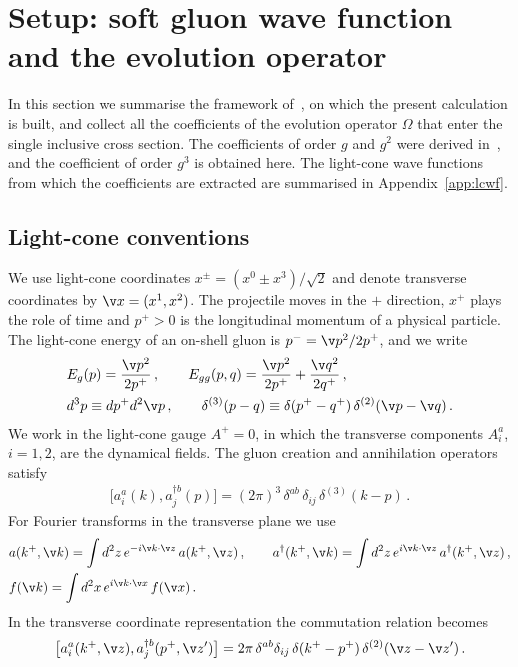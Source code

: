 \section{Setup: soft gluon wave function and the evolution operator}\label{sec:setup}
In this section we summarise the framework of~\cite{Radhakrishnan:2026bxy}, on which the present
calculation is built, and collect all the coefficients of the evolution operator $\Omega$ that enter
the single inclusive cross section. The coefficients of order $g$ and $g^{2}$ were derived
in~\cite{Radhakrishnan:2026bxy}, and the coefficient of order $g^{3}$ is obtained here. The light-cone
wave functions from which the coefficients are extracted are summarised in Appendix~\ref{app:lcwf}.

\subsection{Light-cone conventions}\label{subsec:conventions}
We use light-cone coordinates $x^{\pm}=(x^{0}\pm x^{3})/\sqrt{2}$ and denote transverse coordinates
by $\v x=(x^{1},x^{2})$. The projectile moves in the $+$ direction, $x^{+}$ plays the role of time and
$p^{+}>0$ is the longitudinal momentum of a physical particle. The light-cone energy of an on-shell
gluon is $p^{-}=\v p^{2}/2p^{+}$, and we write
\begin{align}
&E_g(p)=\frac{\v p^2}{2p^+}\,,\qquad E_{gg}(p,q)=\frac{\v p^2}{2p^+}+\frac{\v q^2}{2q^+}\,,\notag\\
&d^3p\equiv dp^+d^2\v p\,,\qquad \delta^{(3)}(p-q)\equiv\delta(p^+-q^+)\,\delta^{(2)}(\v p-\v q)\,.
\end{align}
We work in the light-cone gauge $A^{+}=0$, in which the transverse components $A^{a}_{i}$,
$i=1,2$, are the dynamical fields. The gluon creation and annihilation operators satisfy
\begin{align}\label{eq:aadagger}
\big[a^a_i(k),a^{\dagger b}_j(p)\big]=(2\pi)^3\,\delta^{ab}\,\delta_{ij}\,\delta^{(3)}(k-p)\,.
\end{align}
For Fourier transforms in the transverse plane we use
\begin{align}\label{eq:FTconventions}
&a(k^+,\v k)=\int d^2z\,e^{-i\v k\cdot\v z}\,a(k^+,\v z)\,,\qquad
a^\dagger(k^+,\v k)=\int d^2z\,e^{i\v k\cdot\v z}\,a^\dagger(k^+,\v z)\,,\notag\\
&f(\v k)=\int d^2x\,e^{i\v k\cdot\v x}\,f(\v x)\,.
\end{align}
In the transverse coordinate representation the commutation relation becomes
\begin{align}\label{eq:commutation}
\big[a^a_i(k^+,\v z),a^{\dagger b}_j(p^+,\v z')\big]=2\pi\,\delta^{ab}\delta_{ij}\,\delta(k^+-p^+)\,\delta^{(2)}(\v z-\v z')\,.
\end{align}
